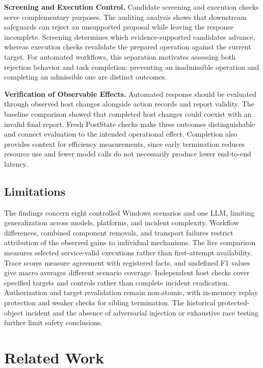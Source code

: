 \documentclass[pdflatex,sn-basic]{sn-jnl}
\begin{document}
\noindent\textbf{Screening and Execution Control.} Candidate screening and execution checks serve complementary purposes. The auditing analysis shows that downstream safeguards can reject an unsupported proposal while leaving the response incomplete. Screening determines which evidence-supported candidates advance, whereas execution checks revalidate the prepared operation against the current target. For automated workflows, this separation motivates assessing both rejection behavior and task completion: preventing an inadmissible operation and completing an admissible one are distinct outcomes.

\noindent\textbf{Verification of Observable Effects.} Automated response should be evaluated through observed host changes alongside action records and report validity. The baseline comparison showed that completed host changes could coexist with an invalid final report. Fresh PostState checks make these outcomes distinguishable and connect evaluation to the intended operational effect. Completion also provides context for efficiency measurements, since early termination reduces resource use and fewer model calls do not necessarily produce lower end-to-end latency.

\subsection{Limitations}

The findings concern eight controlled Windows scenarios and one LLM, limiting generalization across models, platforms, and incident complexity. Workflow differences, combined component removals, and transport failures restrict attribution of the observed gains to individual mechanisms. The live comparison measures selected service-valid executions rather than first-attempt availability. Trace scores measure agreement with registered facts, and undefined F1 values give macro averages different scenario coverage. Independent host checks cover specified targets and controls rather than complete incident eradication. Authorization and target revalidation remain non-atomic, with in-memory replay protection and weaker checks for sibling termination. The historical protected-object incident and the absence of adversarial injection or exhaustive race testing further limit safety conclusions.  

\section{Related Work}
\label{sec:related}
\end{document}
